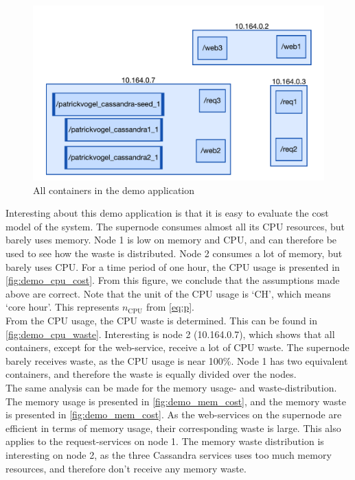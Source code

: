 \begin{figure}
    \centering
    \includegraphics[width=\textwidth]{gfx/demo_app}
    \caption{All containers in the demo application}
    \label{fig:demo_app}
\end{figure}

\noindent
Interesting about this demo application is that it is easy to evaluate the cost model of the system. The supernode consumes almost all its CPU resources, but barely uses memory. Node 1 is low on memory and CPU, and can therefore be used to see how the waste is distributed. Node 2 consumes a lot of memory, but barely uses CPU. For a time period of one hour, the CPU usage is presented in \autoref{fig:demo_cpu_cost}. From this figure, we conclude that the assumptions made above are correct. Note that the unit of the CPU usage is `CH', which means `core hour'. This represents $n_\text{CPU}$ from \autoref{eq:p}.\\

\noindent
From the CPU usage, the CPU waste is determined. This can be found in \autoref{fig:demo_cpu_waste}. Interesting is node 2 (10.164.0.7), which shows that all containers, except for the web-service, receive a lot of CPU waste. The supernode barely receives waste, as the CPU usage is near 100\%. Node 1 has two equivalent containers, and therefore the waste is equally divided over the nodes. \\

\noindent
The same analysis can be made for the memory usage- and waste-distribution. The memory usage is presented in \autoref{fig:demo_mem_cost}, and the memory waste is presented in \autoref{fig:demo_mem_cost}. As the web-services on the supernode are efficient in terms of memory usage, their corresponding waste is large. This also applies to the request-services on node 1. The memory waste distribution is interesting on node 2, as the three Cassandra services uses too much memory resources, and therefore don't receive any memory waste.\\

